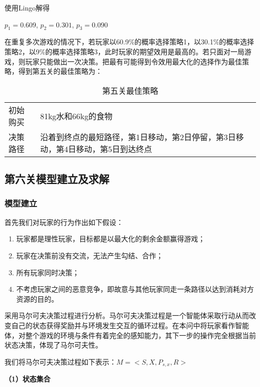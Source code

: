 \documentclass[bwprint]{cumcmthesis} %
\begin{document}
使用Lingo解得
\begin{center}
    $p_1=0.609$,  \quad 
    $p_2=0.301$,  \quad 
    $p_3=0.090$
\end{center}

在重复多次游戏的情况下，若玩家以60.9\%的概率选择策略1，以30.1\%的概率选择策略2，以9\%的概率选择策略3，此时玩家的期望效用是最高的。若只面对一局游戏，则玩家只能做出一次决策。把最有可能得到令效用最大化的选择作为最佳策略，得到第五关的最佳策略为：
\begin{table}[!htbp]
    \caption{第五关最佳策略}\label{tab:strategy} \centering
    \begin{tabular}{p{2cm}p{13cm}}
        \midrule[1pt]
        初始购买 & 81kg水和66kg的食物 \\
        决策路径 & 沿着到终点的最短路径，第1日移动，第2日停留，第3日移动，第4日移动，第5日到达终点 \\
        \bottomrule[1pt]
    \end{tabular}
\end{table}

\subsection{第六关模型建立及求解}

\subsubsection{模型建立}
首先我们对玩家的行为作出如下假设：

\begin{enumerate}
    \item 玩家都是理性玩家，目标都是以最大化的剩余金额赢得游戏；
    \item 玩家在决策前没有交流，无法产生勾结、合作；
    \item 所有玩家同时决策；
    \item 不考虑玩家之间的恶意竞争，即故意与其他玩家同走一条路径以达到消耗对方资源的目的。
\end{enumerate}

采用马尔可夫决策过程进行分析。马尔可夫决策过程是一个智能体采取行动从而改变自己的状态获得奖励并与环境发生交互的循环过程。在本问中将玩家看作智能体，对整个游戏的环境与条件有着完全的感知能力，其下一步的操作完全根据当前状态决策，体现了马尔可夫性。

我们将马尔可夫决策过程如下表示：$ M = < S, X, P_{s,x}, R > $

\textbf{（1）状态集合}
\end{document}
